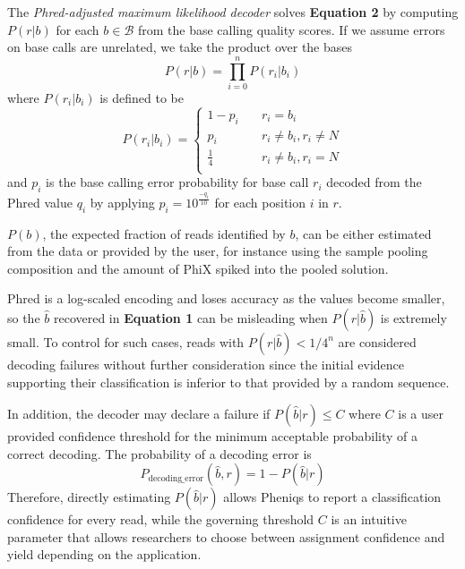 \documentclass[10pt,twocolumn]{article}
\begin{document}
The \emph{Phred-adjusted maximum likelihood decoder} solves \textbf{Equation 2} by computing $P(r|b)$ for each $b \in \mathcal{B}$ from the base calling quality scores. If we assume errors on base calls are unrelated, we take the product over the bases \citep{EA884454-5858-46F9-85F9-77FA53B1AC66}
%
\begin{equation}
P(r|b) = \prod_{i=0}^n P(r_{i}|b_{i})
\end{equation}
%
where $P(r_{i}|b_{i})$ is defined to be
%
\begin{equation}
P(r_{i}|b_{i}) = \begin{cases} 1 - p_{i} & \quad {r_{i} = b_{i}}\\ p_{i} & \quad {r_{i} \ne b_{i}, r_{i} \ne N}\\ \frac{1}{4} & \quad {r_{i} \ne b_{i}, {r_{i} = N}}\\ \end{cases}
\end{equation}
%
and $p_{i}$ is the base calling error probability for base call $r_{i}$ decoded from the Phred value $q_{i}$ by applying $p_{i} = 10^{\frac{-q_{i}}{10}}$ for each position $i$ in $r$.

$P(b)$, the expected fraction of reads identified by $b$, can be either estimated from the data or provided by the user, for instance using the sample pooling composition and the amount of PhiX spiked into the pooled solution.

Phred is a log-scaled encoding and loses accuracy as the values become smaller, so the $\hat{b}$ recovered in \textbf{Equation 1} can be misleading when $P(r|\hat{b})$ is extremely small. To control for such cases,
reads with $P(r|\hat{b}) < 1/4^n$ are considered decoding failures without further consideration since the initial evidence supporting their classification is inferior to that provided by a random sequence.

In addition, the decoder may declare a failure if $P(\hat{b}|r) \leq C$ where $C$ is a user provided confidence threshold for the minimum acceptable probability of a correct decoding. The probability of a decoding error is
%
\begin{equation}
P_{\text{decoding\_error}}(\hat{b}, r) = 1 - P(\hat{b}|r)
\end{equation}
%
 Therefore, directly estimating $P(\hat{b}|r)$ allows Pheniqs to report a classification confidence for every read, while the governing threshold $C$ is an intuitive parameter that allows researchers to choose between assignment confidence and yield depending on the application.
\end{document}
